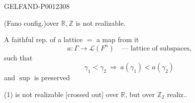 \begin{GelfandAdjacentEvidence}{GELFAND-P001230}{8}

(Fano config.)\qquad over \(\mathbb R,\mathbb Z\) is not realizable.

A faithful rep. of a lattice \(=\) a map from it
\begin{equation*}
a:\Gamma\longrightarrow\mathcal L(F^n)\quad\text{--- lattice of subspaces,}
\end{equation*}
such that
\begin{equation*}
\gamma_1<\gamma_2\ \Rightarrow\ a(\gamma_1)<a(\gamma_2)
\end{equation*}
and \(\sup\) is preserved

(1) is not realizable [crossed out] over \(\mathbb R\), but over \(\mathbb Z_2\) realiz..
\end{GelfandAdjacentEvidence}



